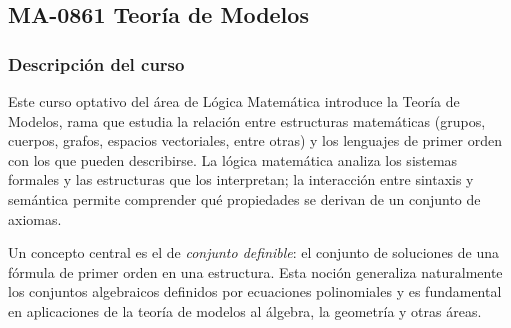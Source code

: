 \newpage
\subsection*{MA-0861 Teoría de Modelos}

\hypertarget{MA0861}{}
\begin{refsection}
\begin{table}[H]
\end{table}

\subsubsection*{Descripción del curso}

Este curso optativo del área de Lógica Matemática introduce la Teoría de Modelos, rama que estudia la relación entre estructuras matemáticas (grupos, cuerpos, grafos, espacios vectoriales, entre otras) y los lenguajes de primer orden con los que pueden describirse. La lógica matemática analiza los sistemas formales y las estructuras que los interpretan; la interacción entre sintaxis y semántica permite comprender qué propiedades se derivan de un conjunto de axiomas.

Un concepto central es el de \emph{conjunto definible}: el conjunto de soluciones de una fórmula de primer orden en una estructura. Esta noción generaliza naturalmente los conjuntos algebraicos definidos por ecuaciones polinomiales y es fundamental en aplicaciones de la teoría de modelos al álgebra, la geometría y otras áreas.


\end{refsection}
